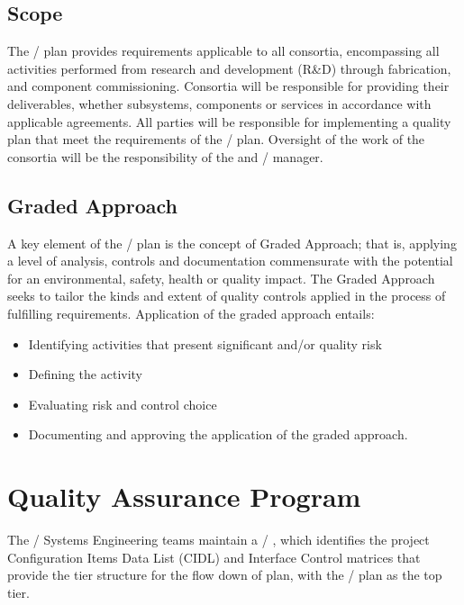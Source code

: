 \subsection{Scope}

The /  plan provides 
requirements applicable to all consortia, encompassing all activities
performed from research and development (R\&D) through fabrication,
and component commissioning. Consortia will be responsible for
providing their deliverables, whether subsystems, components or
services in accordance with applicable agreements. All parties will be
responsible for implementing a quality plan that meet the requirements
of the /  plan. Oversight of the
work of the consortia will be the responsibility of the 
 and / 
manager. 

\subsection{Graded Approach}

A key element of the /  plan is the
concept of Graded Approach; that is, applying a level of analysis,
controls and documentation commensurate with the potential for an
environmental, safety, health or quality impact. The Graded Approach
seeks to tailor the kinds and extent of quality controls applied in
the process of fulfilling requirements. Application of the graded
approach entails:
\begin{itemize}
  \item Identifying activities that present significant 
    and/or quality risk
  \item Defining the activity
  \item Evaluating risk and control choice
  \item Documenting and approving the application of the graded
    approach.
\end{itemize}

\section{Quality Assurance Program}

The / Systems Engineering teams maintain a
/ , which identifies the project
Configuration Items Data List (CIDL) and Interface Control matrices
that provide the tier structure for the flow down of  plan,
with the /  plan as the top tier.

